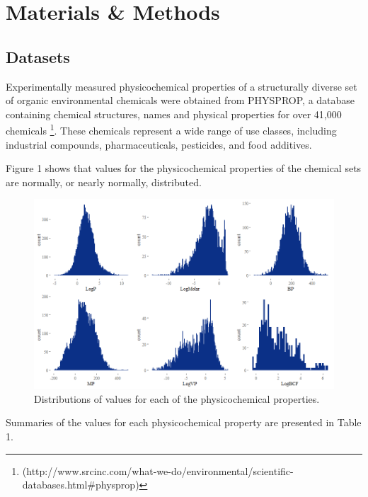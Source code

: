 \documentclass[10pt, letter]{article}
\renewcommand{\=}{\, =\, }
\newcommand{\+}{\, +\, }
\renewcommand{\-}{\, -\, }
\begin{document}
\section{Materials \& Methods}

\subsection{Datasets}

Experimentally measured physicochemical properties of a structurally diverse set
of organic environmental chemicals were obtained from PHYSPROP, a database containing chemical structures, names and physical properties for over 41,000 chemicals \cite{howard2000physprop} \footnote{(http://www.srcinc.com/what-we-do/environmental/scientific-databases.html\#physprop)}.  These chemicals represent a wide range of use classes,
including industrial compounds, pharmaceuticals, pesticides, and food additives.

Figure 1 shows that values for the physicochemical properties of the chemical
sets are normally, or nearly normally, distributed.

\begin{figure}[H]
  \caption{Distributions of values for each of the physicochemical properties.}
  \centering
    \includegraphics[scale=0.65]{properties.png}
\end{figure}

Summaries of the values for each physicochemical property are presented in Table 1.
\end{document}
